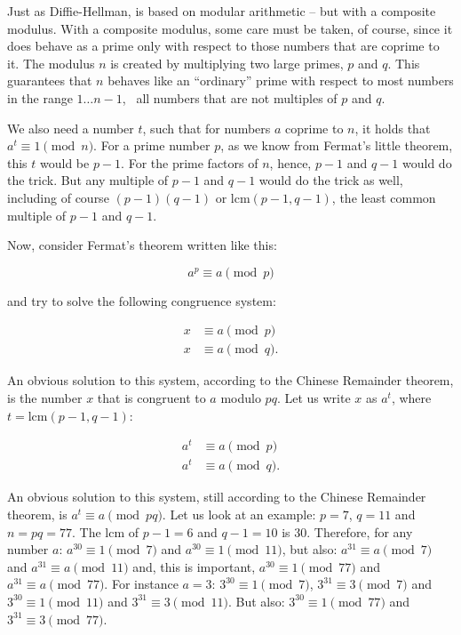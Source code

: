 \documentclass{scrreprt}
\begin{document}
Just as Diffie-Hellman,  is based 
on modular arithmetic -- but with a composite modulus.
With a composite modulus, some care must be taken,
of course, since it does behave as
a prime only with respect to those numbers
that are coprime to it. 
The modulus $n$ is created by multiplying two large primes,
$p$ and $q$. This guarantees that $n$ behaves like 
an ``ordinary'' prime with respect to most numbers
in the range $1\dots n-1$, \viz\ all numbers
that are not multiples of $p$ and $q$.

We also need a number
$t$, such that for numbers $a$ coprime to $n$,
it holds that $a^t \equiv 1 \pmod{n}$.
For a prime number $p$, 
as we know from Fermat's little theorem,
this $t$ would be $p-1$.
For the prime factors of $n$, hence,
$p-1$ and $q-1$ would do the trick.
But any multiple of $p-1$ and $q-1$
would do the trick as well, including of course
$(p-1)(q-1)$ or $\textrm{lcm}(p-1,q-1)$,
the least common multiple of $p-1$ and $q-1$.

Now, consider Fermat's theorem written like this:

\begin{equation}
a^p \equiv a \pmod{p}
\end{equation}

and try to solve the following congruence system:

\begin{align*}
x & \equiv a \pmod{p}\\
x & \equiv a \pmod{q}.
\end{align*}

An obvious solution to this system,
according to the Chinese Remainder theorem,
is the number $x$ that is congruent to $a$ modulo $pq$.
Let us write $x$ as $a^t$, 
where $t = \textrm{lcm}(p-1,q-1)$:

\begin{align*}
a^t & \equiv a \pmod{p}\\
a^t & \equiv a \pmod{q}.
\end{align*}

An obvious solution to this system,
still according to the Chinese Remainder theorem,
is $a^t \equiv a \pmod{pq}$.
Let us look at an example: $p=7$, $q=11$ and $n = pq = 77$.
The $\textrm{lcm}$ of $p-1=6$ and $q-1=10$ is 30.
Therefore, for any number $a$: 
$a^{30} \equiv 1 \pmod{7}$ and
$a^{30} \equiv 1 \pmod{11}$,
but also:
$a^{31} \equiv a \pmod{7}$ and
$a^{31} \equiv a \pmod{11}$ 
and, this is important,
$a^{30} \equiv 1 \pmod{77}$ and
$a^{31} \equiv a \pmod{77}$.
For instance $a=3$: 
$3^{30} \equiv 1 \pmod{7}$, 
$3^{31} \equiv 3 \pmod{7}$ and
$3^{30} \equiv 1 \pmod{11}$ and
$3^{31} \equiv 3 \pmod{11}$. 
But also:
$3^{30} \equiv 1 \pmod{77}$ and
$3^{31} \equiv 3 \pmod{77}$.
\end{document}
